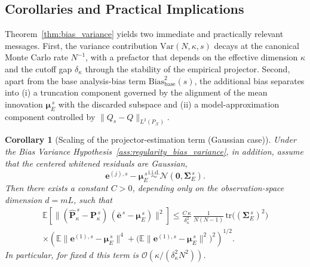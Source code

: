 \documentclass[11pt,a4paper]{article}
\newtheorem{corollary}{Corollary}
\begin{document}
\FloatBarrier





\subsection{Corollaries and Practical Implications}
\label{subsec:corollaries_implications}

Theorem~\ref{thm:bias_variance} yields two immediate and practically relevant messages. First, the variance contribution $\mathrm{Var}(N,\kappa,s)$ decays at the canonical Monte Carlo rate $N^{-1}$, with a prefactor that depends on the effective dimension $\kappa$ and the cutoff gap $\delta_\kappa$ through the stability of the empirical projector. Second, apart from the base analysis-bias term $\mathrm{Bias}_{\mathrm{base}}^{2}(s)$, the additional bias separates into (i) a truncation component governed by the alignment of the mean innovation $\boldsymbol{\mu}_E^{\,s}$ with the discarded subspace and (ii) a model-approximation component controlled by $\|Q_s-Q\|_{L^2(P_{\mathcal{X}})}$.

\begin{corollary}[Scaling of the projector-estimation term (Gaussian case)]
\label{cor:projector_term_scaling_gaussian}
Under the Bias Variance Hypothesis~\ref{ass:regularity_bias_variance}, in addition, assume that the centered whitened residuals are Gaussian,
\begin{equation}
\mathbf{e}^{(j),s}-\boldsymbol{\mu}_E^{\,s}\stackrel{\mathrm{i.i.d.}}{\sim}\mathcal{N}(\mathbf{0},\boldsymbol{\Sigma}_E^{\,s}).
\end{equation}
Then there exists a constant $C>0$, depending only on the observation-space dimension $d=mL$, such that
\begin{multline*}
\mathbb{E}\!\left[\|(\hat{\mathbf{P}}_\kappa^{\,s}-\mathbf{P}_\kappa^{\,s})\,(\bar{\mathbf{e}}^{\,s}-\boldsymbol{\mu}_E^{\,s})\|^2\right]
\le
\frac{C\,\kappa}{\delta_\kappa^2}\,
\frac{1}{N(N-1)}\,
\mathrm{tr}\!\bigl((\boldsymbol{\Sigma}_E^{\,s})^2\bigr)\\
\times\left(\mathbb{E}\|\mathbf{e}^{(1),s}-\boldsymbol{\mu}_E^{\,s}\|^4+\bigl(\mathbb{E}\|\mathbf{e}^{(1),s}-\boldsymbol{\mu}_E^{\,s}\|^2\bigr)^2\right)^{1/2}.
\end{multline*}
In particular, for fixed $d$ this term is $\mathcal{O}(\kappa/(\delta_\kappa^2N^2))$.
\end{corollary}
\end{document}
